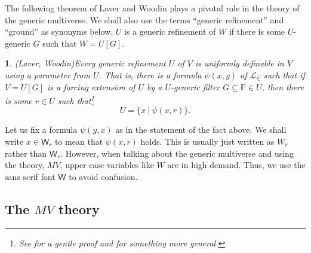 \documentclass[10pt,a4paper]{amsart}
\numberwithin{equation}{section}
\numberwithin{figure}{section}
\theoremstyle{plain}
\theoremstyle{plain}
\newtheorem{fact}[thm]{\protect\factname}
\theoremstyle{plain}
\theoremstyle{plain}
\theoremstyle{remark}
\theoremstyle{plain}
\theoremstyle{definition}
\providecommand{\factname}{Fact}
\begin{document}
The following theorem of Laver and Woodin plays a pivotal role in
the theory of the generic multiverse. We shall also use the terms
``generic refinement'' and ``ground'' as synonyms below. $U$
is a generic refinement of $W$ if there is some $U$-generic $G$
such that $W=U[G]$.
\begin{fact}
(Laver, Woodin)\label{fact:Laver,-Woodin} Every generic refinement
$U$ of $V$ is uniformly definable in $V$ using a parameter from
$U$. That is, there is a formula $\psi(x,y)$ of $\mathcal{L}_{\in}$
such that if $V=U[G]$ is a forcing extension of $U$ by a $U$-generic
filter $G\subseteq\mathbb{P}\in U$, then there is some $r\in U$
such that\footnote{See \citep{ReitzTGA} for a gentle proof and \citep{WoodinGM} for
something more general. } 
\[
U=\{x\ |\ \psi(x,r)\}.
\]
\end{fact}

Let us fix a formula $\psi(y,x)$ as in the statement of the fact
above. We shall write $x\in\mathsf{W}_{r}$ to mean that $\psi(x,r)$
holds. This is usually just written as $W_{r}$ rather than $\mathsf{W}_{r}$.
However, when talking about the generic multiverse and using the theory,
$MV$, upper case variables like $W$ are in high demand. Thus, we
use the sans serif font $\mathsf{W}$ to avoid confusion. 

\subsection{The $MV$ theory\label{subsec:The--theory}}
\end{document}
